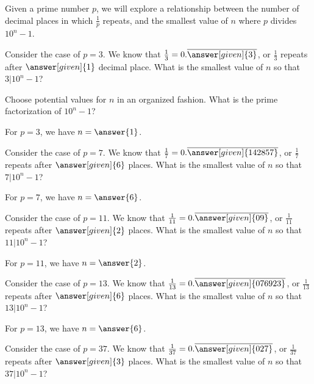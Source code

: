 \documentclass[nooutcomes]{ximera}
\begin{document}
\begin{problem}
Given a prime number $p$, we will explore a relationship between the number of decimal places in which $\frac{1}{p}$ repeats, and the smallest value of $n$ where $p$ divides $10^n - 1$.

Consider the case of $p=3$.  We know that $\frac{1}{3} = 0.\overline{\answer[given]{3}}$, or $\frac{1}{3}$ repeats after $\answer[given]{1}$ decimal place.  What is the smallest value of $n$ so that $3 \vert 10^n - 1$?
\begin{hint}
Choose potential values for $n$ in an organized fashion.  What is the prime factorization of $10^n-1$?
\end{hint}


\begin{prompt}
For $p=3$, we have $n=\answer{1}$.
\end{prompt}

\begin{problem}
Consider the case of $p=7$.  We know that $\frac{1}{7} = 0.\overline{\answer[given]{142857}}$, or $\frac{1}{7}$ repeats after $\answer[given]{6}$ places.  What is the smallest value of $n$ so that $7 \vert 10^n -1$?

\begin{prompt}
For $p=7$, we have $n=\answer{6}$.
\end{prompt}


\begin{problem}
Consider the case of $p=11$.  We know that $\frac{1}{11} = 0.\overline{\answer[given]{09}}$, or $\frac{1}{11}$ repeats after $\answer[given]{2}$ places.  What is the smallest value of $n$ so that $11 \vert 10^n -1$?

\begin{prompt}
For $p=11$, we have $n=\answer{2}$.
\end{prompt}

Consider the case of $p=13$.  We know that $\frac{1}{13} = 0.\overline{\answer[given]{076923}}$, or $\frac{1}{13}$ repeats after $\answer[given]{6}$ places.  What is the smallest value of $n$ so that $13 \vert 10^n -1$?

\begin{prompt}
For $p=13$, we have $n=\answer{6}$.
\end{prompt}

Consider the case of $p=37$.  We know that $\frac{1}{37} = 0.\overline{\answer[given]{027}}$, or $\frac{1}{37}$ repeats after $\answer[given]{3}$ places.  What is the smallest value of $n$ so that $37 \vert 10^n -1$?


\end{problem}
\end{problem}
\end{problem}
\end{document}
